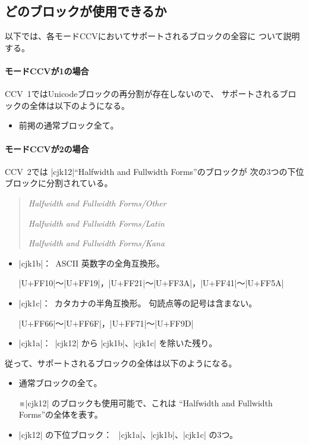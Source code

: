 \documentclass[uplatex,dvipdfmx,a4paper]{jsarticle}
\newcommand{\Note}{\par\noindent ※}
\newcommand{\Means}{：~}
\begin{document}
\subsection{どのブロックが使用できるか}

以下では、各モードCCVにおいてサポートされるブロックの全容に
ついて説明する。

\paragraph{モードCCVが1の場合}
CCV~1ではUnicodeブロックの再分割が存在しないので、
サポートされるブロックの全体は以下のようになる。

\begin{itemize}
\item 前掲の通常ブロック全て。
\end{itemize}

\paragraph{モードCCVが2の場合}

CCV~2では |cjk12|“Halfwidth and Fullwidth Forms”のブロックが
次の3つの下位ブロックに分割されている。

\begin{quotation}
  \newcommand\xE[2]{\noindent
    \makebox[4em][l]{\texttt{#1}}\textsl{#2}\par}
  \xE{cjk1a}{Halfwidth and Fullwidth Forms/Other}
  \xE{cjk1b}{Halfwidth and Fullwidth Forms/Latin}
  \xE{cjk1c}{Halfwidth and Fullwidth Forms/Kana}
\end{quotation}

\begin{itemize}
\item |cjk1b|\Means ASCII 英数字の全角互換形。\par
  |U+FF10|～|U+FF19|，|U+FF21|～|U+FF3A|，|U+FF41|～|U+FF5A|
\item |cjk1c|\Means カタカナの半角互換形。
  句読点等の記号は含まない。\par
  |U+FF66|～|U+FF6F|，|U+FF71|～|U+FF9D|
\item |cjk1a|\Means |cjk12| から |cjk1b|、|cjk1c| を除いた残り。
\end{itemize}

従って、サポートされるブロックの全体は以下のようになる。

\begin{itemize}
\item 通常ブロックの全て。
  \Note |cjk12| のブロックも使用可能で、これは
  “Halfwidth and Fullwidth Forms”の全体を表す。
\item |cjk12| の下位ブロック\Means
  |cjk1a|、|cjk1b|、|cjk1c| の3つ。
\end{itemize}
\end{document}
